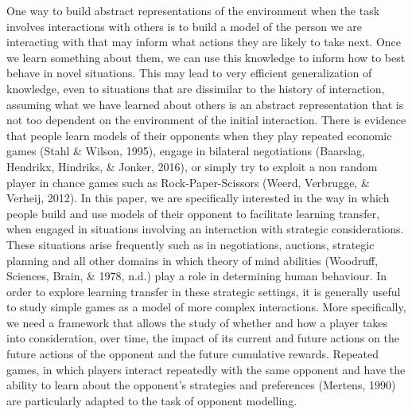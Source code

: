 \documentclass[man,floatsintext]{apa6}
\begin{document}
One way to build abstract representations of the environment when the task involves interactions with others is to build a model of the person we are interacting with that may inform what actions they are likely to take next. Once we learn something about them, we can use this knowledge to inform how to best behave in novel situations. This may lead to very efficient generalization of knowledge, even to situations that are dissimilar to the history of interaction, assuming what we have learned about others is an abstract representation that is not too dependent on the environment of the initial interaction. There is evidence that people learn models of their opponents when they play repeated economic games (Stahl \& Wilson, 1995), engage in bilateral negotiations (Baarslag, Hendrikx, Hindriks, \& Jonker, 2016), or simply try to exploit a non random player in chance games such as Rock-Paper-Scissors (Weerd, Verbrugge, \& Verheij, 2012). In this paper, we are specifically interested in the way in which people build and use models of their opponent to facilitate learning transfer, when engaged in situations involving an interaction with strategic considerations. These situations arise frequently such as in negotiations, auctions, strategic planning and all other domains in which theory of mind abilities (Woodruff, Sciences, Brain, \& 1978, n.d.) play a role in determining human behaviour. In order to explore learning transfer in these strategic settings, it is generally useful to study simple games as a model of more complex interactions. More specifically, we need a framework that allows the study of whether and how a player takes into consideration, over time, the impact of its current and future actions on the future actions of the opponent and the future cumulative rewards. Repeated games, in which players interact repeatedly with the same opponent and have the ability to learn about the opponent's strategies and preferences (Mertens, 1990) are particularly adapted to the task of opponent modelling.
\end{document}
